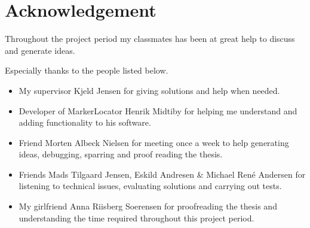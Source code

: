 \section*{Acknowledgement}
Throughout the project period my classmates has been at great help to discuss and generate ideas.

Especially thanks to the people listed below.
\begin{itemize}
	\item My supervisor Kjeld Jensen for giving solutions and help when needed.
	\item Developer of MarkerLocator Henrik Midtiby for helping me understand and adding functionality to his software.
	\item Friend Morten Albeck Nielsen for meeting once a week to help generating ideas, debugging, sparring and proof reading the thesis.
	\item Friends Mads Tilgaard Jensen, Eskild Andresen \& Michael René Andersen for listening to technical issues, evaluating solutions and carrying out tests.
	\item My girlfriend Anna Riisberg Soerensen for proofreading the thesis and understanding the time required throughout this project period.
\end{itemize}
